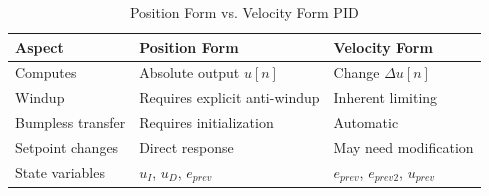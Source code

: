 \begin{table}[htbp]
\centering
\caption{Position Form vs. Velocity Form PID}
\label{tab:position_vs_velocity}
\begin{tabular}{lll}
\toprule
\textbf{Aspect} & \textbf{Position Form} & \textbf{Velocity Form} \\
\midrule
Computes & Absolute output $u[n]$ & Change $\Delta u[n]$ \\
Windup & Requires explicit anti-windup & Inherent limiting \\
Bumpless transfer & Requires initialization & Automatic \\
Setpoint changes & Direct response & May need modification \\
State variables & $u_I$, $u_D$, $e_{prev}$ & $e_{prev}$, $e_{prev2}$, $u_{prev}$ \\
\bottomrule
\end{tabular}
\end{table}

